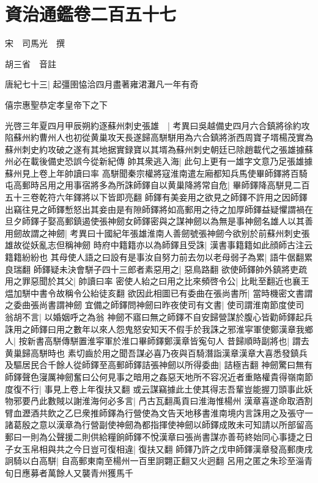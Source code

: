 \section{資治通鑑卷二百五十七}
宋　司馬光　撰

胡三省　音註

唐紀七十三|{
	起彊圉恊洽四月盡著雍涒灘凡一年有奇}


僖宗惠聖恭定孝皇帝下之下

光啓三年夏四月甲辰朔約逐蘇州刺史張雄　|{
	考異曰吳越備史四月六合鎮將徐約攻陷蘇州約曹州人也初從黄巢攻天長遂歸高駢駢用為六合鎮將浙西周寶子壻楊茂實為蘇州刺史約攻破之遂有其地据實録寶以其壻為蘇州刺史朝廷已除趙載代之張雄據蘇州必在載後備史恐誤今從新紀傳}
帥其衆逃入海|{
	此句上更有一雄字文意乃足張雄據蘇州見上卷上年帥讀曰率}
高駢聞秦宗權將寇淮南遣左廂都知兵馬使畢師鐸將百騎屯高郵時呂用之用事宿將多為所誅師鐸自以黄巢降將常自危|{
	畢師鐸降高駢見二百五十三卷乾符六年鐸將以下皆即亮翻}
師鐸有美妾用之欲見之師鐸不許用之因師鐸出竊往見之師鐸慙怒出其妾由是有隙師鐸將如高郵用之待之加厚師鐸益疑懼謂禍在旦夕師鐸子娶高郵鎮遏使張神劒女師鐸密與之謀神劒以為無是事神劒名雄人以其善用劒故謂之神劒|{
	考異曰十國紀年張雄淮南人善劒號張神劒今欲别於前蘇州刺史張雄故從妖亂志但稱神劒}
時府中籍籍亦以為師鐸且受誅|{
	漢書事籍籍如此顔師古注云籍籍紛紛也}
其母使人語之曰設有是事汝自努力前去勿以老母弱子為累|{
	語牛倨翻累良瑞翻}
師鐸疑未決會駢子四十三郎者素惡用之|{
	惡鳥路翻}
欲使師鐸帥外鎮將吏疏用之罪惡聞於其父|{
	帥讀曰率}
密使人紿之曰用之比來頻啓令公|{
	比毗至翻近也襄王煴加駢中書令故稱令公紿徒亥翻}
欲因此相圖已有委曲在張尚書所|{
	當時機密文書謂之委曲張尚書謂神劒}
宜備之師鐸問神劒曰昨夜使司有文書|{
	使司謂淮南節度使司}
翁胡不言|{
	以婚姻呼之為翁}
神劒不寤曰無之師鐸不自安歸營謀於腹心皆勸師鐸起兵誅用之師鐸曰用之數年以來人怨鬼怒安知天不假手於我誅之邪淮寜軍使鄭漢章我鄉人|{
	按新書高駢傳駢置淮寜軍於淮口畢師鐸鄭漢章皆寃句人}
昔歸順時副將也|{
	謂去黄巢歸高駢時也}
素切齒於用之聞吾謀必喜乃夜與百騎潛詣漢章漢章大喜悉發鎮兵及驅居民合千餘人從師鐸至高郵師鐸詰張神劒以所得委曲|{
	詰極吉翻}
神劒驚曰無有師鐸聲色寖厲神劒奮曰公何見事之暗用之姦惡天地所不容况近者重賂權貴得嶺南節度復不行|{
	事見上卷上年復扶又翻}
或云謀竊據此土使其得志吾輩豈能握刀頭事此妖物邪要冎此數賊以謝淮海何必多言|{
	冎古瓦翻禹貢曰淮海惟楊州}
漢章喜遂命取酒割臂血瀝酒共飲之乙巳衆推師鐸為行營使為文告天地移書淮南境内言誅用之及張守一諸葛殷之意以漢章為行營副使神劒為都指揮使神劒以師鐸成敗未可知請以所部留高郵曰一則為公聲援二則供給糧餉師鐸不悅漢章曰張尚書謀亦善苟終始同心事捷之日子女玉帛相與共之今日豈可復相違|{
	復扶又翻}
師鐸乃許之戊申師鐸漢章發高郵庚戌詗騎以白高駢|{
	自高郵東南至楊州一百里詗翾正翻又火迥翻}
呂用之匿之朱珍至淄青旬日應募者萬餘人又襲青州獲馬千

